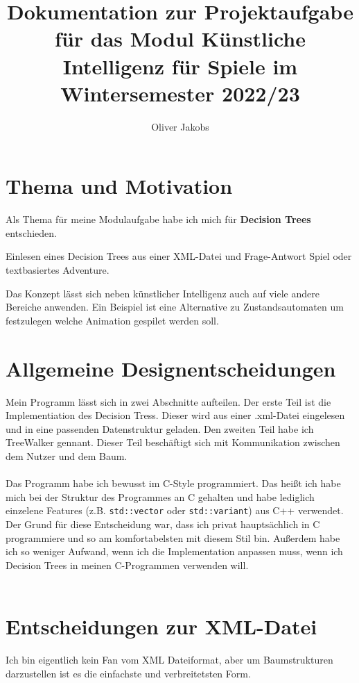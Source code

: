 \documentclass[a4paper,12pt]{article}
\title{Dokumentation zur Projektaufgabe für das Modul Künstliche Intelligenz für Spiele im Wintersemester 2022/23}
\author{Oliver Jakobs}
\begin{document}
\maketitle

\section*{Thema und Motivation}

Als Thema für meine Modulaufgabe habe ich mich für \textbf{Decision Trees} entschieden. 

Einlesen eines Decision Trees aus einer XML-Datei und Frage-Antwort Spiel oder textbasiertes Adventure.

Das Konzept lässt sich neben künstlicher Intelligenz auch auf viele andere Bereiche anwenden. Ein Beispiel ist eine Alternative zu Zustandsautomaten um festzulegen welche Animation gespilet werden soll.

\newpage

\section*{Allgemeine Designentscheidungen}

Mein Programm lässt sich in zwei Abschnitte aufteilen. Der erste Teil ist die Implementiation des Decision Tress. Dieser wird aus einer .xml-Datei eingelesen und in eine passenden Datenstruktur geladen. 
Den zweiten Teil habe ich TreeWalker gennant. Dieser Teil beschäftigt sich mit Kommunikation zwischen dem Nutzer und dem Baum. 
\\
\\
Das Programm habe ich bewusst im C-Style programmiert. Das heißt ich habe mich bei der Struktur des Programmes an C gehalten und habe lediglich einzelene Features (z.B. \texttt{std::vector} oder \texttt{std::variant}) aus C++ verwendet.
Der Grund für diese Entscheidung war, dass ich privat hauptsächlich in C programmiere und so am komfortabelsten mit diesem Stil bin. Außerdem habe ich so weniger Aufwand, wenn ich die Implementation anpassen muss, wenn ich Decision Trees in meinen C-Programmen verwenden will.
\\
\\


\section*{Entscheidungen zur XML-Datei}
Ich bin eigentlich kein Fan vom XML Dateiformat, aber um Baumstrukturen darzustellen ist es die einfachste und verbreitetsten Form.
\end{document}
